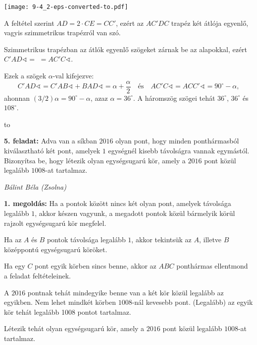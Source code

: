 \documentclass[a4paper,10pt]{article}
\newcommand{\ki}[2]{\hfill {\it #1 (#2)}\medskip}
\newcommand{\vonal}{\hbox to \hsize{\hskip2truecm\hrulefill\hskip2truecm}}
\begin{document}
\begin{center}
\texttt{[image: 9-4\_2-eps-converted-to.pdf]}
\end{center}

\noindent A feltétel szerint $AD=2\cdot CE =CC'$, ezért az $AC'DC$ trapéz két átlója egyenlő, vagyis szimmetrikus trapézról van szó. 

\smallskip

\noindent Szimmetrikus trapézban az átlók egyenlő szögeket zárnak be az alapokkal, ezért $C'AD\sphericalangle =$ $=AC'C\sphericalangle$. 

\smallskip

\noindent Ezek a szögek $\alpha$-val kifejezve:
\[C'AD\sphericalangle = C'AB\sphericalangle + BAD\sphericalangle = \alpha +\frac{\alpha}{2}\quad\text{és}\quad AC'C\sphericalangle = ACC'\sphericalangle = 90^{\circ}-\alpha ,\]%
ahonnan $(3/2)\alpha =90^{\circ}-\alpha$, azaz $\alpha =36^{\circ}$. A háromszög szögei tehát $36^{\circ}$, $36^{\circ}$ és $108^{\circ}$. 

\vonal


{\bf 5. feladat: } Adva van a síkban $2016$ olyan pont, hogy minden ponthármasból kiválasztható két pont, amelyek $1$ egységnél kisebb távolságra vannak egymástól. Bizonyítsa be, hogy létezik olyan egységsugarú kör, amely a $2016$ pont közül legalább $1008$-at tartalmaz.

\ki{Bálint Béla}{Zsolna}\medskip

{\bf 1. megoldás: } Ha a pontok között nincs két olyan pont, amelyek távolsága legalább $1$, akkor készen vagyunk, a megadott pontok közül bármelyik körül rajzolt egységsugarú kör megfelel. 

\smallskip

\noindent Ha az $A$ és $B$ pontok távolsága legalább $1$, akkor tekintsük az $A$, illetve $B$ középpontú egységsugarú köröket. 

\smallskip

\noindent Ha egy $C$ pont egyik körben sincs benne, akkor az $ABC$ ponthármas ellentmond a feladat feltételeinek.

\smallskip

\noindent A $2016$ pontnak tehát mindegyike benne van a két kör közül legalább az egyikben.
Nem lehet mindkét körben $1008$-nál kevesebb pont.
(Legalább) az egyik kör tehát legalább 1008 pontot tartalmaz.

\smallskip

\noindent Létezik tehát olyan egységsugarú kör, amely a $2016$ pont közül legalább $1008$-at tartalmaz.
\end{document}
